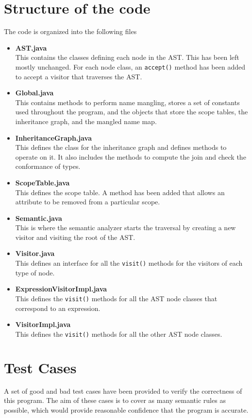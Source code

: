 \documentclass{article}
\begin{document}
\section{Structure of the code}
The code is organized into the following files
\begin{itemize}
	\item \textbf{AST.java} \\
	This contains the classes defining each node in the AST. This has been left mostly unchanged. For each node class, an \verb|accept()| method has been added to accept a visitor that traverses the AST.
	\item \textbf{Global.java} \\
	This contains methods to perform name mangling, stores a set of constants used throughout the program, and the objects that store the scope tables, the inheritance graph, and the mangled name map.
	\item \textbf{InheritanceGraph.java} \\
	This defines the class for the inheritance graph and defines methods to operate on it. It also includes the methods to compute the join and check the conformance of types.
	\item \textbf{ScopeTable.java} \\
	This defines the scope table. A method has been added that allows an attribute to be removed from a particular scope.
	\item \textbf{Semantic.java} \\
	This is where the semantic analyzer starts the traversal by creating a new visitor and visiting the root of the AST.
	\item \textbf{Visitor.java} \\
	This defines an interface for all the \verb|visit()| methods for the visitors of each type of node.
	\item \textbf{ExpressionVisitorImpl.java} \\
	This defines the \verb|visit()| methods for all the AST node classes that correspond to an expression.
	\item \textbf{VisitorImpl.java} \\
	This defines the \verb|visit()| methods for all the other AST node classes.
\end{itemize}

\section{Test Cases}
A set of good and bad test cases have been provided to verify the correctness of this program. The aim of these cases is to cover as many semantic rules as possible, which would provide reasonable confidence that the program is accurate.
\end{document}

